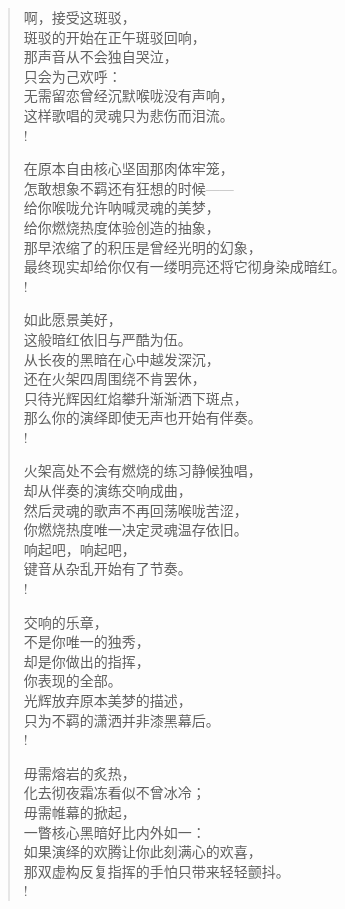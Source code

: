 \documentclass[UTF8, 12pt, a4paper]{ctexrep} %
\begin{document}
\begin{verse}
    啊，接受这斑驳，\\
    斑驳的开始在正午斑驳回响，\\
    那声音从不会独自哭泣，\\
    只会为己欢呼：\\
    无需留恋曾经沉默喉咙没有声响，\\
    这样歌唱的灵魂只为悲伤而泪流。\\!

    在原本自由核心坚固那肉体牢笼，\\
    怎敢想象不羁还有狂想的时候——\\
    给你喉咙允许呐喊灵魂的美梦，\\
    给你燃烧热度体验创造的抽象，\\
    那早浓缩了的积压是曾经光明的幻象，\\
    最终现实却给你仅有一缕明亮还将它彻身染成暗红。\\!

    如此愿景美好，\\
    这般暗红依旧与严酷为伍。\\
    从长夜的黑暗在心中越发深沉，\\
    还在火架四周围绕不肯罢休，\\
    只待光辉因红焰攀升渐渐洒下斑点，\\
    那么你的演绎即使无声也开始有伴奏。\\!

    火架高处不会有燃烧的练习静候独唱，\\
    却从伴奏的演练交响成曲，\\
    然后灵魂的歌声不再回荡喉咙苦涩，\\
    你燃烧热度唯一决定灵魂温存依旧。\\
    响起吧，响起吧，\\
    键音从杂乱开始有了节奏。\\!

    交响的乐章，\\
    不是你唯一的独秀，\\
    却是你做出的指挥，\\
    你表现的全部。\\
    光辉放弃原本美梦的描述，\\
    只为不羁的潇洒并非漆黑幕后。\\!

    毋需熔岩的炙热，\\
    化去彻夜霜冻看似不曾冰冷；\\
    毋需帷幕的掀起，\\
    一瞥核心黑暗好比内外如一：\\
    如果演绎的欢腾让你此刻满心的欢喜，\\
    那双虚构反复指挥的手怕只带来轻轻颤抖。\\!


\end{verse}
\end{document}
